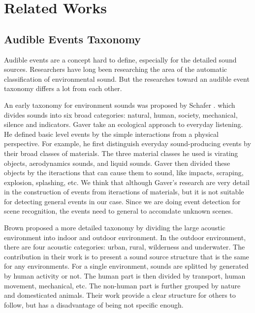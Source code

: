 \chapter{Related Works}
\section{Audible Events Taxonomy}
Audible events are a concept hard to define, especially for the detailed sound sources. 
Researchers have long been researching the area of the automatic classification of environmental sound. 
But the researches toward an audible event taxonomy differs a lot from each other. 

An early taxonomy for environment sounds was proposed by Schafer \et \cite{schafer1993soundscape}. which divides sounds into six broad categories: natural, human, society, mechanical, silence and indicators. 
Gaver \et \cite{gaver1993world} take an ecological approach to everyday listening. 
He defined basic level events by the simple interactions from a physical perspective. 
For example, he first distinguish everyday sound-producing events by their broad classes of materials. 
The three material classes he used is virating objects, aerodynamics sounds, and liquid sounds. 
Gaver then divided these objects by the iteractions that can cause them to sound, like impacts, scraping, explosion, splashing, etc. 
We think that although Gaver's research are very detail in the construction of events from iteractions of materials, but it is not suitable for detecting general events in our case. 
Since we are doing event detection for scene recognition, the events need to general to accomdate unknown scenes. 
 
Brown \et \cite{brown2011towards} proposed a more detailed taxonomy by dividing the large acoustic environment into indoor and outdoor environment. 
In the outdoor environment, there are four acoustic categories: urban, rural, wilderness and underwater. 
The contribution in their work is to present a sound source structure that is the same for any environments. 
For a single environment, sounds are splitted by generated by human activity or not. 
The human part is then divided by transport, human movement, mechanical, etc. 
The non-human part is further grouped by nature and domesticated animals. 
Their work provide a clear structure for others to follow, but has a disadvantage of being not specific enough. 

